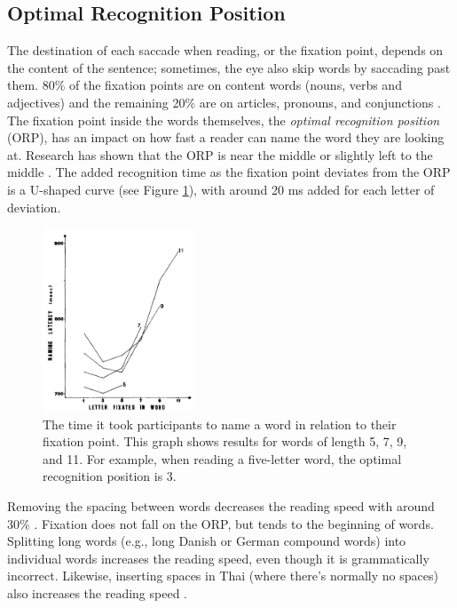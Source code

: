 \subsection{Optimal Recognition Position} \label{ORP}
The destination of each saccade when reading, or the fixation point, depends on the content of the sentence; sometimes, the eye also skip words by saccading past them. 80\% of the fixation points are on content words (nouns, verbs and adjectives) and the remaining 20\% are on articles, pronouns, and conjunctions \cite{eysenck_cognitive_2010}. The fixation point inside the words themselves, the \textit{optimal recognition position} (ORP), has an impact on how fast a reader can name the word they are looking at. Research has shown that the ORP is near the middle or slightly left to the middle \cite{oregan_optimal_1992, nazir_letter_1998, oregan_convenient_1984}. The added recognition time as the fixation point deviates from the ORP is a U-shaped curve (see Figure \ref{fig:ucurve}), with around 20 ms added for each letter of deviation.

\begin{figure}[htbp]
\centering
\includegraphics[width=0.4\textwidth]{Pics/ucurve}
\caption{The time it took participants to name a word in relation to their fixation point. This graph shows results for words of length 5, 7, 9, and 11. For example, when reading a five-letter word, the optimal recognition position is 3. \protect\cite{oregan_convenient_1984}}
\label{fig:ucurve}
\end{figure}

Removing the spacing between words decreases the reading speed with around 30\% \cite{eyeMovement}. Fixation does not fall on the ORP, but tends to the beginning of words. Splitting long words (e.g., long Danish or German compound words) into individual words increases the reading speed, even though it is grammatically incorrect. Likewise, inserting spaces in Thai (where there's normally no spaces) also increases the reading speed \cite{eyeMovement}.